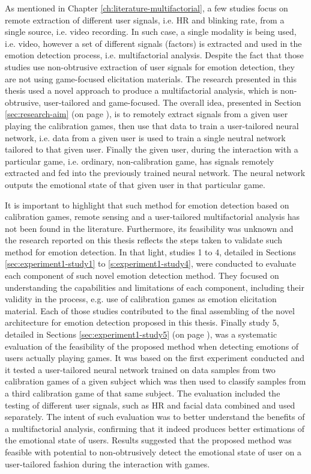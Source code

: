 As mentioned in Chapter \ref{ch:literature-multifactorial}, a few studies focus on remote extraction of different user signals, i.e. HR and blinking rate, from a single source, i.e. video recording. In such case, a single modality is being used, i.e. video, however a set of different signals (factors) is extracted and used in the emotion detection process, i.e. multifactorial analysis. Despite the fact that those studies use non-obtrusive extraction of user signals for emotion detection, they are not using game-focused elicitation materials. The research presented in this thesis used a novel approach to produce a multifactorial analysis, which is non-obtrusive, user-tailored and game-focused. The overall idea, presented in Section \ref{sec:research-aim} (on page \pageref{sec:research-aim}), is to remotely extract signals from a given user playing the calibration games, then use that data to train a user-tailored neural network, i.e. data from a given user is used to train a single neutral network tailored to that given user. Finally the given user, during the interaction with a particular game, i.e. ordinary, non-calibration game, has signals remotely extracted and fed into the previously trained neural network. The neural network outputs the emotional state of that given user in that particular game.

It is important to highlight that such method for emotion detection based on calibration games, remote sensing and a user-tailored multifactorial analysis has not been found in the literature. Furthermore, its feasibility was unknown and the research reported on this thesis reflects the steps taken to validate such method for emotion detection. In that light, studies 1 to 4, detailed in Sections \ref{sec:experiment1-study1} to \ref{s:experiment1-study4}, were conducted to evaluate each component of such novel emotion detection method. They focused on understanding the capabilities and limitations of each component, including their validity in the process, e.g. use of calibration games as emotion elicitation material. Each of those studies contributed to the final assembling of the novel architecture for emotion detection proposed in this thesis. Finally study 5, detailed in Sections \ref{sec:experiment1-study5} (on page \pageref{sec:experiment1-study5}), was a systematic evaluation of the feasibility of the proposed method when detecting emotions of users actually playing games. It was based on the first experiment conducted and it tested a user-tailored neural network trained on data samples from two calibration games of a given subject which was then used to classify samples from a third calibration game of that same subject. The evaluation included the testing of different user signals, such as HR and facial data combined and used separately. The intent of such evaluation was to better understand the benefits of a multifactorial analysis, confirming that it indeed produces better estimations of the emotional state of users. Results suggested that the proposed method was feasible with potential to non-obtrusively detect the emotional state of user on a user-tailored fashion during the interaction with games.

